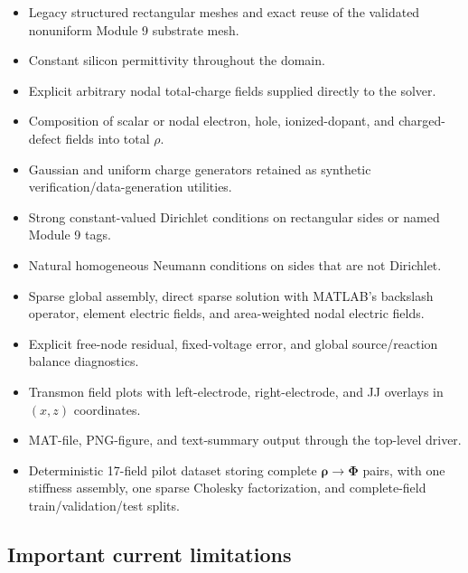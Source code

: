 \documentclass[11pt]{article}
\begin{document}
\begin{itemize}[leftmargin=*]
  \item Legacy structured rectangular meshes and exact reuse of the validated nonuniform Module 9 substrate mesh.
  \item Constant silicon permittivity throughout the domain.
  \item Explicit arbitrary nodal total-charge fields supplied directly to the solver.
  \item Composition of scalar or nodal electron, hole, ionized-dopant, and charged-defect fields into total $\rho$.
  \item Gaussian and uniform charge generators retained as synthetic verification/data-generation utilities.
  \item Strong constant-valued Dirichlet conditions on rectangular sides or named Module 9 tags.
  \item Natural homogeneous Neumann conditions on sides that are not Dirichlet.
  \item Sparse global assembly, direct sparse solution with MATLAB's backslash operator, element electric fields, and area-weighted nodal electric fields.
  \item Explicit free-node residual, fixed-voltage error, and global source/reaction balance diagnostics.
  \item Transmon field plots with left-electrode, right-electrode, and JJ overlays in $(x,z)$ coordinates.
  \item MAT-file, PNG-figure, and text-summary output through the top-level driver.
  \item Deterministic 17-field pilot dataset storing complete $\bm{\rho}\rightarrow\bm{\Phi}$ pairs, with one stiffness assembly, one sparse Cholesky factorization, and complete-field train/validation/test splits.
\end{itemize}

\subsection{Important current limitations}
\end{document}
